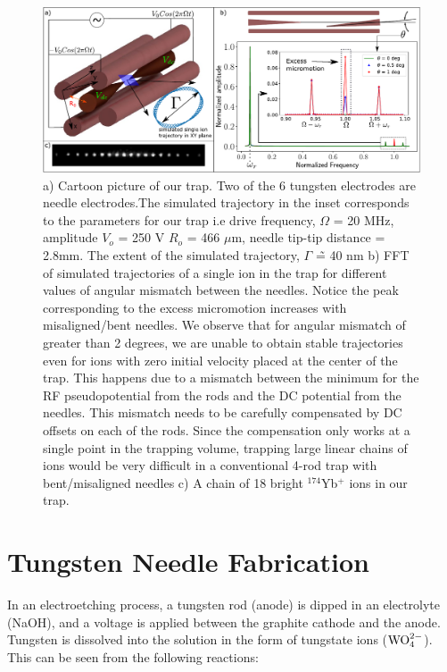 \documentclass[%
 aip,
 amsmath,amssymb,
 reprint,%
]{revtex4-1}
\begin{document}
\begin{figure}
    \centering
    \includegraphics[width = \linewidth]{IonTrap.pdf}
    \caption{a) Cartoon picture of our trap. Two of the 6 tungsten electrodes are needle electrodes.The simulated trajectory in the inset corresponds to the parameters for our trap i.e drive frequency, $\Omega$  = 20 MHz, amplitude $V_o$ = 250 V $R_o$ = 466 $\mu$m, needle tip-tip distance = 2.8mm. The extent of the simulated trajectory, $\Gamma$ \~= 40 nm b) FFT of simulated trajectories of a single ion in the trap for different values of angular mismatch between the needles. Notice the peak corresponding to the excess micromotion increases with misaligned/bent needles. We observe that for angular mismatch of greater than 2 degrees, we are unable to obtain stable trajectories even for ions with zero initial velocity placed at the center of the trap. This happens due to a mismatch between the minimum for the RF pseudopotential from the rods and the DC potential from the needles. This mismatch needs to be carefully compensated by DC offsets on each of the rods. Since the compensation only works at a single point in the trapping volume, trapping large linear chains of ions would be very difficult in a conventional 4-rod trap with bent/misaligned needles  c) A chain of 18 bright $^{174}$Yb$^+$ ions in our trap. }
    \label{fig : ion trap}
\end{figure}


\section{\label{sec:level1 Tungsten Needle Fabrication} Tungsten Needle Fabrication }

In an electroetching process, a tungsten rod (anode) is dipped in an electrolyte (NaOH), and a voltage is applied between the graphite cathode and the anode.
 Tungsten is dissolved into the solution in the form of tungstate ions ($\rm{WO}_4^{2-}$).
 This can be seen from the following reactions\cite{reactions}:
\end{document}
